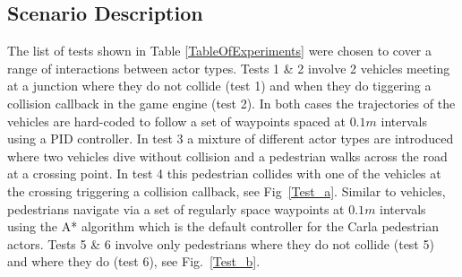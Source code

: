 \documentclass[letterpaper, 10 pt, journal, twoside]{IEEEtran}
\begin{document}


\subsection{Scenario Description}\label{TestsDescriptionAndTechnicalities}
The list of tests shown in Table \ref{TableOfExperiments} were chosen to cover a range of interactions between actor types. Tests 1 \& 2 involve 2 vehicles meeting at a junction where they do not collide (test 1) and when they do tiggering a collision callback in the game engine (test 2). In both cases the trajectories of the vehicles are hard-coded to follow a set of waypoints spaced at $0.1m$ intervals using a PID controller. In test 3 a mixture of different actor types are introduced where two vehicles dive without collision and a pedestrian walks across the road at a crossing point. In test 4 this pedestrian collides with one of the vehicles at the crossing triggering a collision callback, see Fig~\ref{Test_a}. Similar to vehicles, pedestrians navigate via a set of regularly space waypoints at $0.1m$ intervals using the A* algorithm which is the default controller for the Carla pedestrian actors. Tests 5 \& 6 involve only pedestrians where they do not collide (test 5) and where they do (test 6), see Fig.~\ref{Test_b}. 

\end{document}
